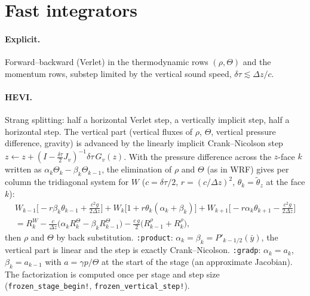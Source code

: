 \documentclass[11pt,a4paper]{article}
\newcommand{\code}[1]{\texttt{#1}}
\begin{document}
\section{Fast integrators}
\paragraph{Explicit.} Forward--backward (Verlet) in the thermodynamic rows $(\rho,\Theta)$ and the momentum rows,
substep limited by the vertical sound speed, $\delta\tau\lesssim\Delta z/c$.
\paragraph{HEVI.} Strang splitting: half a horizontal Verlet step, a vertically implicit step, half a
horizontal step. The vertical part (vertical fluxes of $\rho$, $\Theta$, vertical pressure difference, gravity)
is advanced by the linearly implicit Crank--Nicolson step
$z\leftarrow z+(I-\tfrac{\delta\tau}2J_v)^{-1}\delta\tau\,G_v(z)$. With the pressure difference across the $z$-face $k$
written as $\alpha_k\Theta_k-\beta_k\Theta_{k-1}$, the elimination of $\rho$ and $\Theta$ (as in WRF) gives per column the
tridiagonal system for $W$ ($c=\delta\tau/2$, $r=(c/\Delta z)^2$, $\theta_k=\tilde\theta_z$ at the face $k$):
\begin{multline*}
W_{k-1}\Big[-r\beta_k\theta_{k-1}+\frac{c^2g}{2\Delta z}\Big]+W_k\big[1+r\theta_k(\alpha_k+\beta_k)\big]
+W_{k+1}\Big[-r\alpha_k\theta_{k+1}-\frac{c^2g}{2\Delta z}\Big]\\
=R^W_k-\frac c{\Delta z}\big(\alpha_kR^\Theta_k-\beta_kR^\Theta_{k-1}\big)-\frac{c\,g}2\big(R^\rho_{k-1}+R^\rho_k\big),
\end{multline*}
then $\rho$ and $\Theta$ by back substitution. \code{:product}: $\alpha_k=\beta_k=P'_{k-1/2}(\bar y)$, the vertical
part is linear and the step is exactly Crank--Nicolson. \code{:gradp}: $\alpha_k=a_k$, $\beta_k=a_{k-1}$ with
$a=\gamma p/\Theta$ at the start of the stage (an approximate Jacobian). The factorization is computed once per
stage and step size (\code{frozen\_stage\_begin!}, \code{frozen\_vertical\_step!}).
\end{document}
